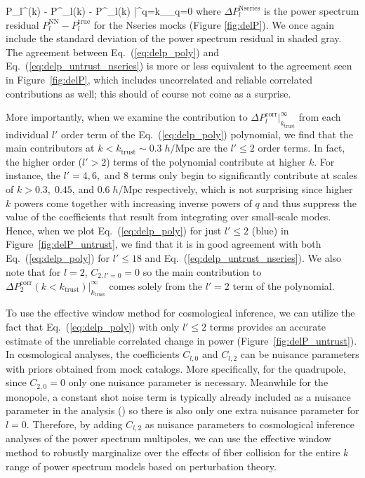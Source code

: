 \beq \label{eq:delp_untrust_nseries}
    \Delta P_l^(k) - \Delta P^_l(k) - 
    \Delta P^_l(k) \bigg|^{q=k_}_{q=0}
\eeq  
where $\Delta P_l^\mathrm{Nseries}$ is the power spectrum 
residual $P_l^\mathrm{NN}- P_l^\mathrm{true}$ for the Nseries mocks (Figure \ref{fig:delP}). We once again include the standard deviation 
of the power spectrum residual in shaded gray. The agreement 
between Eq.~(\ref{eq:delp_poly}) and Eq.~(\ref{eq:delp_untrust_nseries}) 
is more or less equivalent to the agreement seen in Figure~\ref{fig:delP}, which includes uncorrelated and reliable correlated contributions as well; this 
should of course not come as a surprise.

More importantly, when we examine the contribution to 
$\Delta P^\mathrm{corr}_l |_{k_\mathrm{trust}}^\infty$ from each individual 
$l'$ order term of the Eq.~(\ref{eq:delp_poly}) polynomial, we find that the
main contributors at $k < k_\mathrm{trust} \sim 0.3\; h/\mathrm{Mpc}$ are 
the $l' \leq 2$ order terms. In fact, the higher order ($l' > 2$) terms of the 
polynomial contribute at higher $k$. For instance, the $l' = 4, 6,$ and $ 8$ terms 
only begin to significantly contribute at scales of $k > 0.3, \; 0.45$, and 
$0.6\;h/\mathrm{Mpc}$ respectively, which is not surprising since higher $k$ powers come together with increasing inverse powers of $q$ and thus suppress the value of the coefficients that result from integrating over small-scale modes. Hence, when we plot Eq.~(\ref{eq:delp_poly})  
for just $l' \leq 2$ (blue) in Figure~\ref{fig:delP_untrust}, we find that 
it is in good agreement with both Eq.~(\ref{eq:delp_poly}) for $l' \leq 18$ 
and Eq.~(\ref{eq:delp_untrust_nseries}). We also note that for $l = 2$, 
$C_{2, l'=0} = 0$ so the main contribution to 
$\Delta P^\mathrm{corr}_2(k < k_\mathrm{trust}) |_{k_\mathrm{trust}}^\infty$ 
comes solely from the $l' = 2$ term of the polynomial. 

To use the effective window method for cosmological inference, we can 
utilize the fact that Eq.~(\ref{eq:delp_poly}) with only $l' \leq 2$ terms 
provides an accurate estimate of the unreliable correlated change in power (Figure~\ref{fig:delP_untrust}). In cosmological analyses, the coefficients $C_{l, 0}$ and $C_{l, 2}$
can be nuisance parameters with priors obtained from  
mock catalogs. More specifically, for the quadrupole, since $C_{2, 0} = 0$
only one nuisance parameter is necessary. Meanwhile 
for the monopole, a constant shot noise term is typically already included as
a nuisance parameter in the analysis (\citealt{Beutler:2014aa,Beutler:2016aa,Grieb:2016aa,Gil-Marin:2016aa}) so there is 
also only one extra nuisance parameter for $l=0$. Therefore, 
by adding $C_{l, 2}$ as nuisance parameters to cosmological inference 
analyses of the power spectrum multipoles, we can use the effective window 
method to robustly marginalize over the effects of fiber collision for the 
entire $k$ range of power spectrum models based on perturbation theory. 

